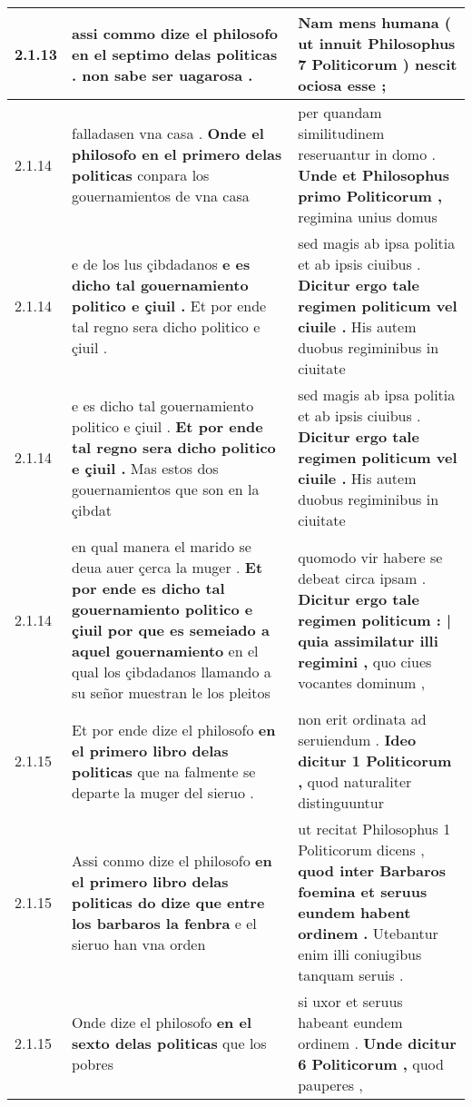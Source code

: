 \begin{tabular}{|p{1cm}|p{6.5cm}|p{6.5cm}|}
2.1.13 & assi commo dize el philosofo \textbf{ en el septimo delas politicas . } non sabe ser uagarosa . & Nam mens humana \textbf{ ( ut innuit Philosophus 7 Politicorum ) } nescit ociosa esse ; \\\hline
2.1.14 & falladasen vna casa . \textbf{ Onde el philosofo en el primero delas politicas } conpara los gouernamientos de vna casa & per quandam similitudinem reseruantur in domo . \textbf{ Unde et Philosophus primo Politicorum , } regimina unius domus \\\hline
2.1.14 & e de los lus çibdadanos \textbf{ e es dicho tal gouernamiento politico e çiuil . } Et por ende tal regno sera dicho politico e çiuil . & sed magis ab ipsa politia et ab ipsis ciuibus . \textbf{ Dicitur ergo tale regimen politicum vel ciuile . } His autem duobus regiminibus in ciuitate \\\hline
2.1.14 & e es dicho tal gouernamiento politico e çiuil . \textbf{ Et por ende tal regno sera dicho politico e çiuil . } Mas estos dos gouernamientos que son en la çibdat & sed magis ab ipsa politia et ab ipsis ciuibus . \textbf{ Dicitur ergo tale regimen politicum vel ciuile . } His autem duobus regiminibus in ciuitate \\\hline
2.1.14 & en qual manera el marido se deua auer çerca la muger . \textbf{ Et por ende es dicho tal gouernamiento politico e çiuil por que es semeiado a aquel gouernamiento } en el qual los çibdadanos llamando a su señor muestran le los pleitos & quomodo vir habere se debeat circa ipsam . \textbf{ Dicitur ergo tale regimen politicum : | quia assimilatur illi regimini , } quo ciues vocantes dominum , \\\hline
2.1.15 & Et por ende dize el philosofo \textbf{ en el primero libro delas politicas } que na falmente se departe la muger del sieruo . & non erit ordinata ad seruiendum . \textbf{ Ideo dicitur 1 Politicorum , } quod naturaliter distinguuntur \\\hline
2.1.15 & Assi conmo dize el philosofo \textbf{ en el primero libro delas politicas do dize que entre los barbaros la fenbra } e el sieruo han vna orden & ut recitat Philosophus 1 Politicorum dicens , \textbf{ quod inter Barbaros foemina et seruus eundem habent ordinem . } Utebantur enim illi coniugibus tanquam seruis . \\\hline
2.1.15 & Onde dize el philosofo \textbf{ en el sexto delas politicas } que los pobres & si uxor et seruus habeant eundem ordinem . \textbf{ Unde dicitur 6 Politicorum , } quod pauperes , \\\hline

\end{tabular}
